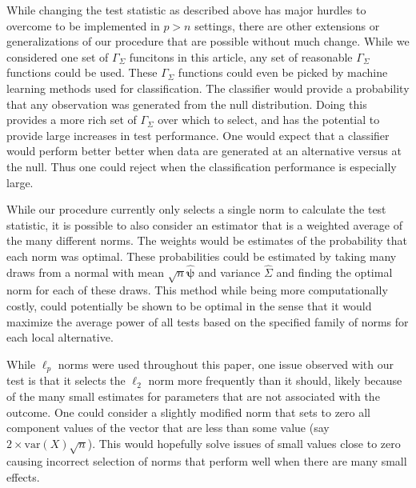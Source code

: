 \documentclass{article}
\newcommand{\Gammaf}{\Gamma_{\Sigma}}
\begin{document}
While changing the test statistic as described above has major hurdles to overcome to be implemented in $p > n$ settings, there are other extensions or generalizations of our procedure that are possible without much change.  While we considered one set of $\Gammaf$ funcitons in this article, any set of reasonable $\Gammaf$ functions could be used.  These $\Gammaf$ functions could even be picked by machine learning methods used for classification.  The classifier would provide a probability that any observation was generated from the null distribution.  Doing this provides a more rich set of $\Gammaf$ over which to select, and has the potential to provide large increases in test performance.  One would expect that a classifier would perform better better when data are generated at an alternative versus at the null.  Thus one could reject when the classification performance is especially large.  

While our procedure currently only selects a single norm to calculate the test statistic, it is possible to also consider an estimator that is a weighted average of the many different norms.  The weights would be estimates of the probability that each norm was optimal. These probabilities could be estimated by taking many draws from a normal with mean $\sqrt{n}\hat{\boldsymbol{\psi}}$ and variance $\hat{\Sigma}$ and finding the optimal norm for each of these draws.  This method while being more computationally costly, could potentially be shown to be optimal in the sense that it would maximize the average power of all tests based on the specified family of norms for each local alternative. 

While $\ell_p$ norms were used throughout this paper, one issue observed with our test is that it selects the $\ell_2$ norm more frequently than it should, likely because of the many small estimates for parameters that are not associated with the outcome.  One could consider a slightly modified norm that sets to zero all component values of the vector that are less than some value (say $2 \times \text{var}(X)\sqrt{n}$).  This would hopefully solve issues of small values close to zero causing incorrect selection of norms that perform well when there are many small effects.
\end{document}

